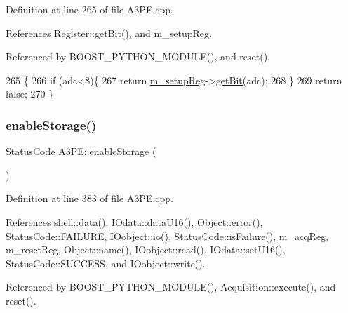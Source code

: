 Definition at line 265 of file A3\+P\+E.\+cpp.



References Register\+::get\+Bit(), and m\+\_\+setup\+Reg.



Referenced by B\+O\+O\+S\+T\+\_\+\+P\+Y\+T\+H\+O\+N\+\_\+\+M\+O\+D\+U\+L\+E(), and reset().


\begin{DoxyCode}
265                                     \{
266   \textcolor{keywordflow}{if} (adc<8)\{
267     \textcolor{keywordflow}{return} \hyperlink{classA3PE_a142fa10b7e705c4701ae21678ec2ec8a}{m\_setupReg}->\hyperlink{classRegister_a5d27c9ff548817eee097ba4fdc8e8f69}{getBit}(adc);
268   \}
269   \textcolor{keywordflow}{return} \textcolor{keyword}{false};
270 \}
\end{DoxyCode}
\mbox{\label{classA3PE_a2071d7922f140ee6705da954efb685f7}} 
\subsubsection{\texorpdfstring{enable\+Storage()}{enableStorage()}}
{\footnotesize\ttfamily \hyperlink{classStatusCode}{Status\+Code} A3\+P\+E\+::enable\+Storage (\begin{DoxyParamCaption}{ }\end{DoxyParamCaption})}



Definition at line 383 of file A3\+P\+E.\+cpp.



References shell\+::data(), I\+Odata\+::data\+U16(), Object\+::error(), Status\+Code\+::\+F\+A\+I\+L\+U\+RE, I\+Oobject\+::io(), Status\+Code\+::is\+Failure(), m\+\_\+acq\+Reg, m\+\_\+reset\+Reg, Object\+::name(), I\+Oobject\+::read(), I\+Odata\+::set\+U16(), Status\+Code\+::\+S\+U\+C\+C\+E\+SS, and I\+Oobject\+::write().



Referenced by B\+O\+O\+S\+T\+\_\+\+P\+Y\+T\+H\+O\+N\+\_\+\+M\+O\+D\+U\+L\+E(), Acquisition\+::execute(), and reset().


